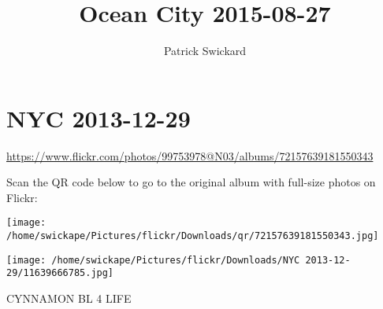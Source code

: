 \documentclass[10pt,letterpaper]{article}
\title{Ocean City 2015-08-27}
\author{Patrick Swickard}
\date{}
\begin{document}
\section*{NYC 2013-12-29}

\url{https://www.flickr.com/photos/99753978@N03/albums/72157639181550343}

Scan the QR code below to go to the original album with full-size photos on Flickr:

\texttt{[image: /home/swickape/Pictures/flickr/Downloads/qr/72157639181550343.jpg]}
\pagebreak

\texttt{[image: /home/swickape/Pictures/flickr/Downloads/NYC 2013-12-29/11639666785.jpg]}

CYNNAMON BL 4 LIFE
\pagebreak
\end{document}

